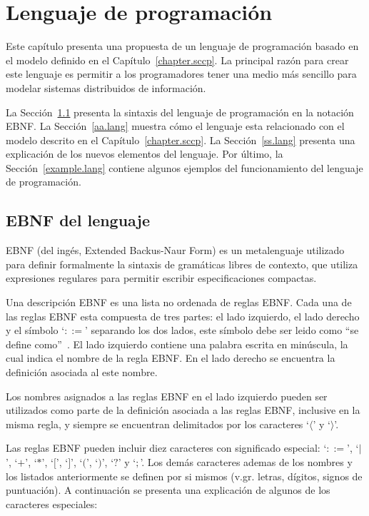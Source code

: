 
\chapter{Lenguaje de programaci\'on}
\label{chapter.lang}

Este cap\'itulo presenta una propuesta de un lenguaje de programaci\'on basado en el modelo \SCCP definido en el Cap\'itulo~\ref{chapter.sccp}. La principal raz\'on para crear este lenguaje es permitir a los programadores tener una medio m\'as sencillo para modelar sistemas distribuidos de informaci\'on. 

La Secci\'on~\ref{ebnf.lang} presenta la sintaxis del lenguaje de programaci\'on en la notaci\'on EBNF. La Secci\'on~\ref{aa.lang} muestra c\'omo el lenguaje esta relacionado con el modelo \SCCP descrito en el Cap\'itulo~\ref{chapter.sccp}. La Secci\'on~\ref{ss.lang} presenta una explicaci\'on de los nuevos elementos del lenguaje. Por \'ultimo, la Secci\'on~\ref{example.lang} contiene algunos ejemplos del funcionamiento del lenguaje de programaci\'on.

\section{EBNF del lenguaje}
\label{ebnf.lang}

EBNF (del ing\'es, Extended Backus-Naur Form) es un metalenguaje utilizado para definir formalmente la sintaxis de gram\'aticas libres de contexto, que utiliza expresiones regulares para permitir escribir especificaciones compactas. 

Una descripci\'on EBNF es una lista no ordenada de reglas EBNF. Cada una de las reglas EBNF esta compuesta de tres partes: el lado izquierdo, el lado derecho y el s\'imbolo `$::=$' separando los dos lados, este s\'imbolo debe ser leido como ``se define como''~\cite{ebnfdoc}. El lado izquierdo contiene una palabra escrita en min\'uscula, la cual indica el nombre de la regla EBNF. En el lado derecho se encuentra la definici\'on asociada al este nombre. 

Los nombres asignados a las reglas EBNF en el lado izquierdo pueden ser utilizados como parte de la definici\'on asociada a las reglas EBNF, inclusive en la misma regla, y siempre se encuentran delimitados por los caracteres `$\langle$' y `$\rangle$'. 

Las reglas EBNF pueden incluir diez caracteres con significado especial: `$::=$', `$|$', `$+$', `$*$', `$[$', `$]$', `$($', `$)$', `$?$' y `$;$'. Los dem\'as caracteres ademas de los nombres y los listados anteriormente se definen por si mismos (v.gr. letras, d\'igitos, signos de puntuaci\'on). A continuaci\'on se presenta una explicaci\'on de algunos de los caracteres especiales:

